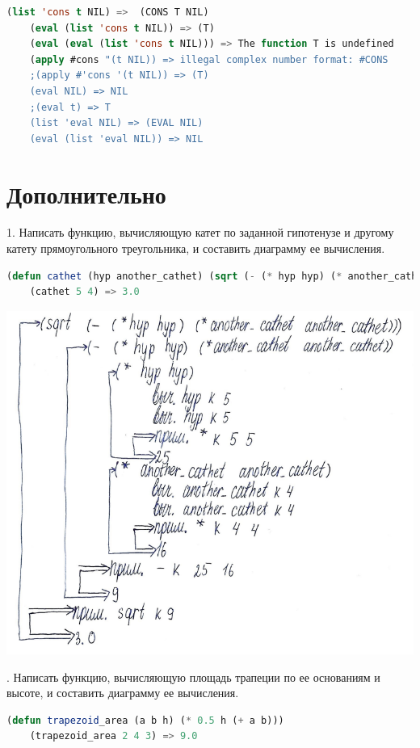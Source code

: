 \documentclass[12pt]{report}
\begin{document}
 
\begin{lstlisting}[language=Lisp]
	(list 'cons t NIL) =>  (CONS T NIL)
	(eval (list 'cons t NIL)) => (T)
	(eval (eval (list 'cons t NIL))) => The function T is undefined
	(apply #cons "(t NIL)) => illegal complex number format: #CONS
	;(apply #'cons '(t NIL)) => (T)
	(eval NIL) => NIL
	;(eval t) => T
	(list 'eval NIL) => (EVAL NIL) 
	(eval (list 'eval NIL)) => NIL
\end{lstlisting}

\clearpage
\section*{Дополнительно}

1. Написать функцию, вычисляющую катет по заданной гипотенузе и другому катету  прямоугольного треугольника, и составить диаграмму ее вычисления.

\begin{lstlisting}[language=Lisp]
	(defun cathet (hyp another_cathet) (sqrt (- (* hyp hyp) (* another_cathet another_cathet))))
	(cathet 5 4) => 3.0
\end{lstlisting}

\includegraphics[scale=1.2]{img/d1}

. Написать функцию, вычисляющую площадь трапеции по ее основаниям и высоте, и составить диаграмму ее вычисления.

\begin{lstlisting}[language=Lisp]
	(defun trapezoid_area (a b h) (* 0.5 h (+ a b)))
	(trapezoid_area 2 4 3) => 9.0
\end{lstlisting}
\end{document}
